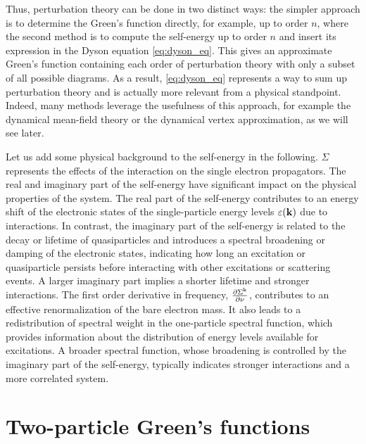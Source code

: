 \documentclass[../../main.tex]{subfiles}
\begin{document}
Thus, perturbation theory can be done in two distinct ways: the simpler approach is to determine the Green's function directly, for example, up to order $n$, where the second method is to compute the self-energy up to order $n$ and insert its expression in the Dyson equation \eqref{eq:dyson_eq}. This gives an approximate Green's function containing each order of perturbation theory with only a subset of all possible diagrams. As a result, \eqref{eq:dyson_eq} represents a way to sum up perturbation theory and is actually more relevant from a physical standpoint. Indeed, many methods leverage the usefulness of this approach, for example the dynamical mean-field theory or the dynamical vertex approximation, as we will see later.

Let us add some physical background to the self-energy in the following. $\Sigma$ represents the effects of the interaction on the single electron propagators. The real and imaginary part of the self-energy have significant impact on the physical properties of the system. The real part of the self-energy contributes to an energy shift of the electronic states of the single-particle energy levels $\varepsilon(\textbf{k})$ due to interactions. In contrast, the imaginary part of the self-energy is related to the decay or lifetime of quasiparticles and introduces a spectral broadening or damping of the electronic states, indicating how long an excitation or quasiparticle persists before interacting with other excitations or scattering events. A larger imaginary part implies a shorter lifetime and stronger interactions. The first order derivative in frequency, $\frac{\partial \Sigma^{\text{k}}}{\partial \nu}$, contributes to an effective renormalization of the bare electron mass. It also leads to a redistribution of spectral weight in the one-particle spectral function, which provides information about the distribution of energy levels available for excitations. A broader spectral function, whose broadening is controlled by the imaginary part of the self-energy, typically indicates stronger interactions and a more correlated system.

\section{Two-particle Green's functions}
\end{document}
